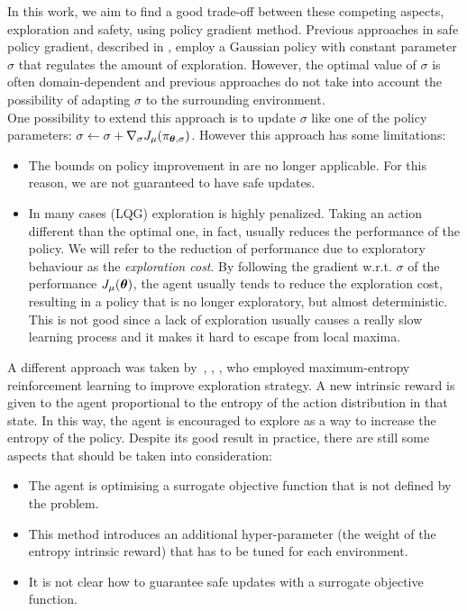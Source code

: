 In this work, we aim to find a good trade-off between these competing aspects, exploration and safety, using policy gradient method. Previous approaches in safe policy gradient, described in , employ a Gaussian policy with constant parameter $\sigma$ that regulates the amount of exploration. However, the optimal value of $\sigma$ is often domain-dependent and previous approaches do not take into account the possibility of adapting $\sigma$ to the surrounding environment.\\
One possibility to extend this approach is to update $\sigma$ like one of the policy parameters: $\sigma \gets \sigma + \nabla_\sigma J_\mu(\pi_{{\boldsymbol{\theta}},\sigma})$. However this approach has some limitations:
\begin{itemize}
\item The bounds on policy improvement in \cite{adaptive_step} are no longer applicable. For this reason, we are not guaranteed to have safe updates.
\item In many cases (\eg LQG) exploration is highly penalized. Taking an action different than the optimal one, in fact, usually reduces the performance of the policy. We will refer to the reduction of performance due to exploratory behaviour as the \textit{exploration cost}. By following the gradient w.r.t. $\sigma$ of the performance $J_\mu({\boldsymbol{\theta}})$, the agent usually tends to reduce the exploration cost, resulting in a policy that is no longer exploratory, but almost deterministic. This is not good since a lack of exploration usually causes a really slow learning process and it makes it hard to escape from local maxima.
\end{itemize}

A different approach was taken by~\cite{haarnoja_reinforcement_2017}, \cite{ziebart_maximum_2008}, \cite{haarnoja2018soft}, who employed maximum-entropy reinforcement learning to improve exploration strategy. A new intrinsic reward is given to the agent proportional to the entropy of the action distribution in that state. In this way, the agent is encouraged to explore as a way to increase the entropy of the policy. Despite its good result in practice, there are still some aspects that should be taken into consideration:
\begin{itemize}
\item The agent is optimising a surrogate objective function that is not defined by the problem.
\item This method introduces an additional hyper-parameter (the weight of the entropy intrinsic reward) that has to be tuned for each environment.
\item It is not clear how to guarantee safe updates with a surrogate objective function.
\end{itemize}

